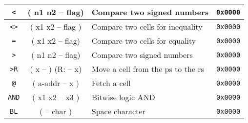 \begin{center}
\begin{longtable}{|c|c|l|c|}
      \texttt{<}                              &
      ( n1 n2 -- flag)                        &
      Compare two signed numbers              &
      \texttt{0x0000}                           \\ \hline
                              
      \texttt{<>}                             &
      ( x1 x2 -- flag )                       &
      Compare two cells for inequality        &
      \texttt{0x0000}                           \\ \hline
                              
      \texttt{=}                              &
      ( x1 x2 -- flag)                        &
      Compare two cells for equality          &
      \texttt{0x0000}                           \\ \hline

      \texttt{>}                              &
      ( n1 n2 -- flag)                        &
      Compare two signed numbers              &
      \texttt{0x0000}                           \\ \hline
                              
      \texttt{>R}                             &
      ( x -- ) (R: -- x)                      &
      Move a cell from the \gls{ps} to the \gls{rs} &
      \texttt{0x0000}                           \\ \hline
                                                         
      \texttt{@}                              &
      ( a-addr -- x )                         &
      Fetch a cell                            &
      \texttt{0x0000}                           \\ \hline
                                              
      \texttt{AND}                            &
      ( x1 x2 -- x3 )                         &
      Bitwise logic AND                       &
      \texttt{0x0000}                           \\ \hline
                                              
      \texttt{BL}                             &
      ( -- char )                             &
      Space character                         &
      \texttt{0x0000}                           \\ \hline
                                              

\end{longtable}
\end{center}
